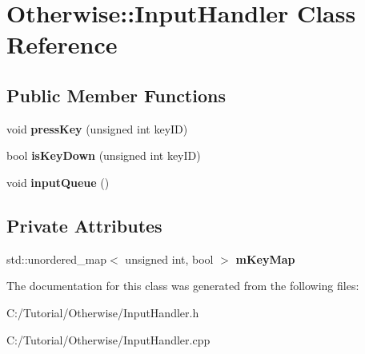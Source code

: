 \hypertarget{class_otherwise_1_1_input_handler}{}\section{Otherwise\+:\+:Input\+Handler Class Reference}
\label{class_otherwise_1_1_input_handler}
\subsection*{Public Member Functions}
\begin{DoxyCompactItemize}
\item 
\mbox{\label{class_otherwise_1_1_input_handler_a0b5664d6c126dace574b277c3158cc4f}} 
void {\bfseries press\+Key} (unsigned int key\+ID)
\item 
\mbox{\label{class_otherwise_1_1_input_handler_a7844ce4ace2b96728330bc90d3eeeab4}} 
bool {\bfseries is\+Key\+Down} (unsigned int key\+ID)
\item 
\mbox{\label{class_otherwise_1_1_input_handler_aec2cab6fb4fc18f0e090d8963a2adfcb}} 
void {\bfseries input\+Queue} ()
\end{DoxyCompactItemize}
\subsection*{Private Attributes}
\begin{DoxyCompactItemize}
\item 
\mbox{\label{class_otherwise_1_1_input_handler_af27d7d8a3e3fad6e77f0f462ba87974c}} 
std\+::unordered\+\_\+map$<$ unsigned int, bool $>$ {\bfseries m\+Key\+Map}
\end{DoxyCompactItemize}


The documentation for this class was generated from the following files\+:\begin{DoxyCompactItemize}
\item 
C\+:/\+Tutorial/\+Otherwise/Input\+Handler.\+h\item 
C\+:/\+Tutorial/\+Otherwise/Input\+Handler.\+cpp\end{DoxyCompactItemize}
